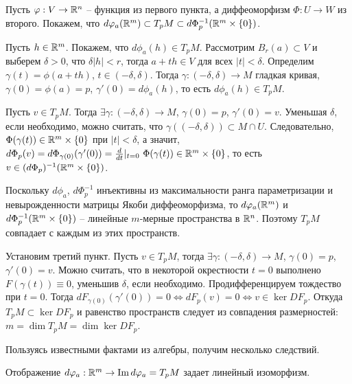 \begin{myproof}
	Пусть $\varphi : V \to \mathbb{R}^n$ -- функция из первого пункта, а диффеоморфизм $\Phi : U \to W$ из второго. 
	Покажем, что $d \varphi_a (\mathbb{R}^m) \subset T_p M \subset d \Phi^{-1}_p (\mathbb{R}^m \times \{0\})$. 

	\vspace{5pt}
	Пусть $h \in \mathbb{R}^m$. Покажем, что $d \phi_a(h) \in T_p M$. Рассмотрим $B_r (a) \subset V$
	и выберем $\delta > 0$, что $\delta |h| < r$, тогда $a + th \in V$ для всех $|t| < \delta$.
	Определим $\gamma(t) = \phi(a + th)$, $t \in (-\delta, \delta)$. 
	Тогда $\gamma : (-\delta, \delta) \to M$ гладкая кривая, $\gamma(0) = \phi(a) = p$, $\gamma'(0) = d \phi_a (h)$, то есть $d \phi_a (h) \in T_p M$. 

	\vspace{5pt}
	Пусть $v \in T_p M$. Тогда $\exists \gamma : (-\delta, \delta) \to M$, $\gamma(0) = p$, $\gamma'(0) = v$. 
	Уменьшая $\delta$, если необходимо, можно считать, что $\gamma((-\delta, \delta)) \subset M \cap U$. 
	Следовательно, $\Phi(\gamma(t)) \in \mathbb{R}^m \times \{0\}$ при $|t| < \delta$, а значит, $d \Phi_p (v) = d \Phi_{\gamma(0)} (\gamma'(0)) = \frac{d}{dt}|_{t=0} \ \Phi(\gamma(t)) \in \mathbb{R}^m \times \{0\}$, 
	то есть $v \in (d \Phi_p)^{-1}(\mathbb{R}^m \times \{0\})$. 
	
	\vspace{5pt}
	Поскольку $d \phi_a$, $d \Phi^{-1}_p$ инъективны из максимальности ранга параметризации и невырожденности матрицы Якоби диффеоморфизма, то $d \varphi_a(\mathbb{R}^m)$ и $d \Phi^{-1}_p(\mathbb{R}^m \times \{0\})$ -- линейные $m$-мерные пространства в $\mathbb{R}^n$. 
	Поэтому $T_p M$ совпадает с каждым из этих пространств. 

	\vspace{5pt}
	Установим третий пункт. Пусть $v \in T_p M$, тогда $\exists \gamma : (-\delta, \delta) \to M$, $\gamma(0) = p$, $\gamma'(0) = v$. 
	Можно считать, что в некоторой окрестности $t = 0$ выполнено $F(\gamma(t)) \equiv 0$, уменьшив $\delta$, если необходимо. 
	Продифференцируем тождество при $t = 0$. 
	Тогда $d F_{\gamma(0)} (\gamma'(0)) = 0 \Leftrightarrow d F_p (v) = 0 \Leftrightarrow v \in \ker DF_p$. 
	Откуда $T_p M \subset \ker DF_p$ и равенство пространств следует из совпадения размерностей: $m = \dim T_p M = \dim \ker DF_p$. 
\end{myproof}

\vspace{5pt}
Пользуясь известными фактами из алгебры, получим несколько следствий.

\begin{corollary}
	Отображение $d \varphi_a : \mathbb{R}^m \to \operatorname{Im} d \varphi_a = T_p M $ задает линейный изоморфизм.
\end{corollary}

